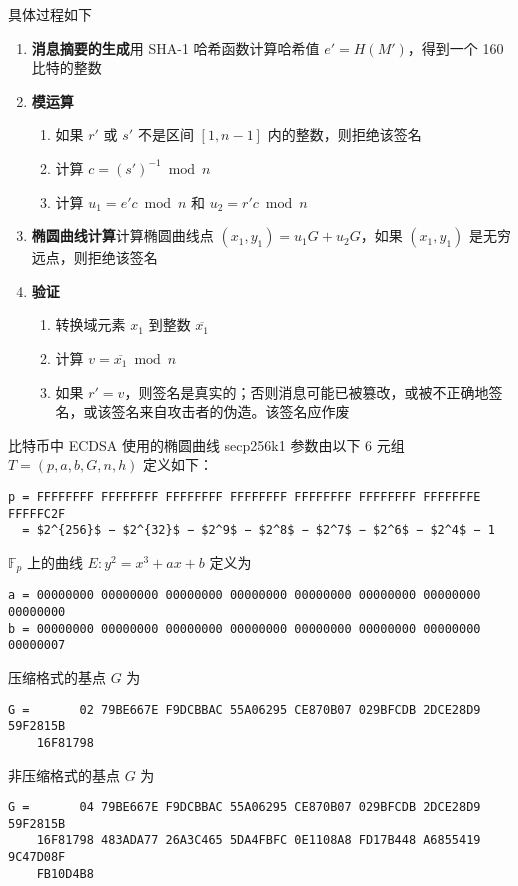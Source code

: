 \documentclass[a4paper,10pt]{article}
\begin{document}
具体过程如下

\begin{enumerate}
  \item \textbf{消息摘要的生成}\quad 用 SHA-1 哈希函数计算哈希值 \(e'=H(M')\)，得到一个 160 比特的整数
  \item \textbf{模运算}
    \begin{enumerate}
      \item 如果 \(r'\) 或 \(s'\) 不是区间 \([1,n-1]\) 内的整数，则拒绝该签名
      \item 计算 \(c=(s')^{-1} \bmod n\)
      \item 计算 \(u_1=e'c\bmod n\) 和 \(u_2=r'c\bmod n\)
    \end{enumerate}
  \item \textbf{椭圆曲线计算}\quad 计算椭圆曲线点 \((x_1,y_1)=u_1G+u_2G\)，如果 \((x_1,y_1)\) 是无穷远点，则拒绝该签名
  \item \textbf{验证}
    \begin{enumerate}
      \item 转换域元素 \(x_1\) 到整数 \(\overline{x_1}\)
      \item 计算 \(v=\overline{x_1}\bmod n\)
      \item 如果 \(r'=v\)，则签名是真实的；否则消息可能已被篡改，或被不正确地签名，或该签名来自攻击者的伪造。该签名应作废
    \end{enumerate}
\end{enumerate}

比特币中 ECDSA 使用的椭圆曲线 secp256k1 参数由以下 6 元组 \(T=(p,a,b,G,n,h)\) 定义如下：
\begin{lstlisting}[mathescape]
p = FFFFFFFF FFFFFFFF FFFFFFFF FFFFFFFF FFFFFFFF FFFFFFFF FFFFFFFE FFFFFC2F
  = $2^{256}$ − $2^{32}$ − $2^9$ − $2^8$ − $2^7$ − $2^6$ − $2^4$ − 1  
\end{lstlisting}

\(\mathbb{F}_p\) 上的曲线 \(E: y^2 = x^3+ax+b\) 定义为
\begin{lstlisting}
a = 00000000 00000000 00000000 00000000 00000000 00000000 00000000 00000000
b = 00000000 00000000 00000000 00000000 00000000 00000000 00000000 00000007
\end{lstlisting}

压缩格式的基点 \(G\) 为 
\begin{lstlisting}
G =       02 79BE667E F9DCBBAC 55A06295 CE870B07 029BFCDB 2DCE28D9 59F2815B
    16F81798
\end{lstlisting}

非压缩格式的基点 \(G\) 为
\begin{lstlisting}
G =       04 79BE667E F9DCBBAC 55A06295 CE870B07 029BFCDB 2DCE28D9 59F2815B
    16F81798 483ADA77 26A3C465 5DA4FBFC 0E1108A8 FD17B448 A6855419 9C47D08F
    FB10D4B8
\end{lstlisting}
\end{document}
